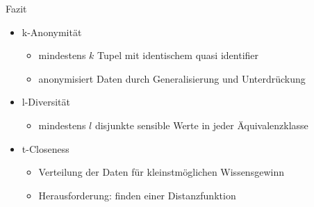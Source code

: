 \begin{frame}{Fazit}
	
\begin{itemize}
	\item k-Anonymität
	\begin{itemize}
		\item mindestens $k$ Tupel mit identischem quasi identifier
		\item anonymisiert Daten durch Generalisierung und Unterdrückung 
	\end{itemize}
\end{itemize}
	\vfill
\begin{itemize}
	\item l-Diversität
	\begin{itemize}
		\item mindestens $l$ disjunkte sensible Werte in jeder Äquivalenzklasse
	\end{itemize}
\end{itemize}	
	\vfill
\begin{itemize}	
	\item t-Closeness
	\begin{itemize}
		\item Verteilung der Daten für kleinstmöglichen Wissensgewinn	
		\item Herausforderung: finden einer Distanzfunktion
	\end{itemize}
\end{itemize}

\end{frame}
